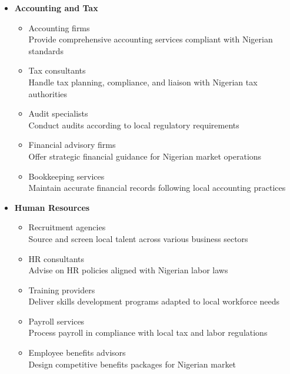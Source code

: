 \begin{tcolorbox}[
    colback=white,
    colframe=primarydark,
    title=\textbf{Business Support Providers},
    before skip=1em,
    after skip=1em
]
    \begin{itemize}[leftmargin=*,itemsep=0.5em]
        \item \textbf{Accounting and Tax}
        \begin{itemize}[itemsep=0.3em]
            \item Accounting firms \\
                \small{Provide comprehensive accounting services compliant with Nigerian standards}
            \item Tax consultants \\
                \small{Handle tax planning, compliance, and liaison with Nigerian tax authorities}
            \item Audit specialists \\
                \small{Conduct audits according to local regulatory requirements}
            \item Financial advisory firms \\
                \small{Offer strategic financial guidance for Nigerian market operations}
            \item Bookkeeping services \\
                \small{Maintain accurate financial records following local accounting practices}
        \end{itemize}

        \vspace{0.5em}

        \item \textbf{Human Resources}
        \begin{itemize}[itemsep=0.3em]
            \item Recruitment agencies \\
                \small{Source and screen local talent across various business sectors}
            \item HR consultants \\
                \small{Advise on HR policies aligned with Nigerian labor laws}
            \item Training providers \\
                \small{Deliver skills development programs adapted to local workforce needs}
            \item Payroll services \\
                \small{Process payroll in compliance with local tax and labor regulations}
            \item Employee benefits advisors \\
                \small{Design competitive benefits packages for Nigerian market}
        \end{itemize}


\end{itemize}
\end{tcolorbox}
